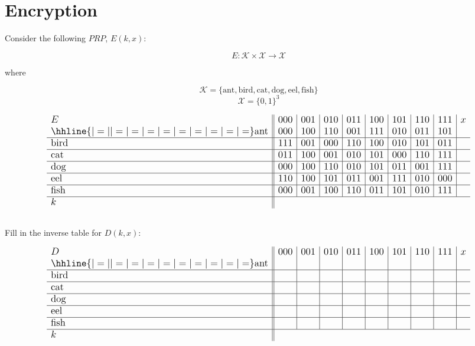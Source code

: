 \documentclass[12pt]{article}
\begin{document}
\section{Encryption}

Consider the following $PRP$, $E(k, x)$:

$$
E : \mathcal{K} \times \mathcal{X} \to \mathcal{X}
$$

where

$$
\mathcal{K} = \{\text{ant},\text{bird},\text{cat},\text{dog},\text{eel},\text{fish}\}
$$
$$
\mathcal{X} = \{0, 1\}^3
$$

$$
\large
\begin{array}{l||c|c|c|c|c|c|c|c|c}
E & 000 & 001 & 010 & 011 & 100 & 101 & 110 & 111 & x\\ \hhline{|=||=|=|=|=|=|=|=|=|=}
 \text{ant} & 000 & 100 & 110 & 001 & 111 & 010 & 011 & 101 \\ \hline
 \text{bird} & 111 & 001 & 000 & 110 & 100 & 010 & 101 & 011 \\ \hline
 \text{cat} & 011 & 100 & 001 & 010 & 101 & 000 & 110 & 111 \\ \hline
 \text{dog} & 000 & 100 & 110 & 010 & 101 & 011 & 001 & 111 \\ \hline
 \text{eel} & 110 & 100 & 101 & 011 & 001 & 111 & 010 & 000 \\ \hline
 \text{fish} & 000 & 001 & 100 & 110 & 011 & 101 & 010 & 111 \\ \hline
k
\end{array}
$$

\subsection{}

Fill in the inverse table for $D(k, x)$:

$$
\large
\begin{array}{l||c|c|c|c|c|c|c|c|c}
D & 000 & 001 & 010 & 011 & 100 & 101 & 110 & 111 & x\\ \hhline{|=||=|=|=|=|=|=|=|=|=}
 \text{ant} &  &  &  &  &  &  &  &  \\ \hline
 \text{bird} &  &  &  &  &  &  &  &  \\ \hline
 \text{cat} &  &  &  &  &  &  &  &  \\ \hline
 \text{dog} &  &  &  &  &  &  &  &  \\ \hline
 \text{eel} &  &  &  &  &  &  &  &  \\ \hline
 \text{fish} &  &  &  &  &  &  &  &  \\ \hline
k
\end{array}
$$
\end{document}
